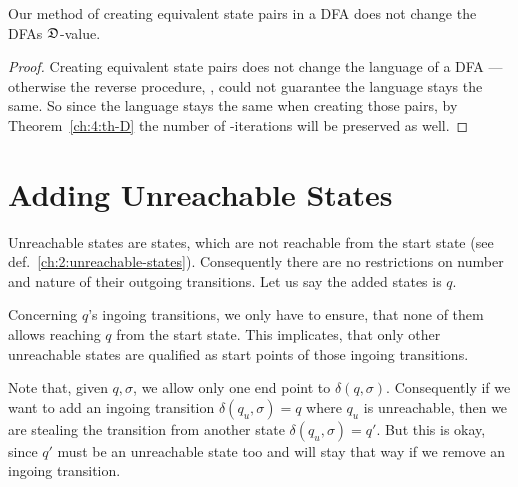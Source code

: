 \begin{corollary}
	Our method of creating equivalent state pairs in a DFA does not change the DFAs $\mathfrak{D}$-value.
\end{corollary}

\begin{proof}
	Creating equivalent state pairs does not change the language of a DFA --- otherwise the reverse procedure, \MinAlg, could not guarantee the language stays the same. So since the language stays the same when creating those pairs, by Theorem~\ref{ch:4:th-D} the number of \CompDist-iterations will be preserved as well.
\end{proof}

\section{Adding Unreachable States}

Unreachable states are states, which are not reachable from the start state (see def.~\ref{ch:2:unreachable-states}). Consequently there are no restrictions on number and nature of their outgoing transitions. Let us say the added states is $q$.

Concerning $q$'s ingoing transitions, we only have to ensure, that none of them allows reaching $q$ from the start state. This implicates, that only other unreachable states are qualified as start points of those ingoing transitions.

Note that, given $q, \sigma$, we allow only one end point to $\delta(q, \sigma)$. Consequently if we want to add an ingoing transition $\delta(q_u, \sigma) = q$ where $q_u$ is unreachable, then we are stealing the transition from another state $\delta(q_u, \sigma) = q'$. But this is okay, since $q'$ must be an unreachable state too and will stay that way if we remove an ingoing transition.

